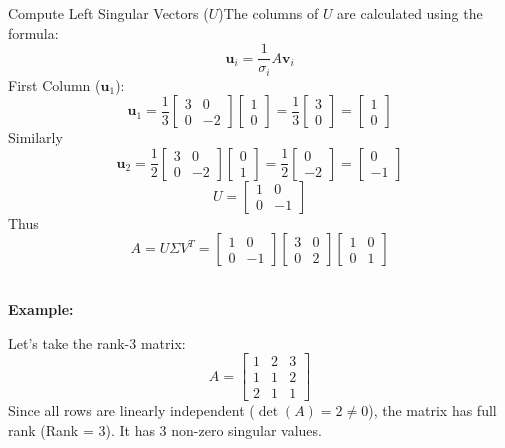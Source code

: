 \documentclass[DIV=20,oneside]{scrartcl}
\newcommand{\example}{
	\noindent\textbf{\\Example: }
}
\begin{document}
\begin{itemize}
	Compute Left Singular Vectors ($U$)The columns of $U$ are calculated using the formula:$$\mathbf{u}_i = \frac{1}{\sigma_i} A \mathbf{v}_i$$First Column ($\mathbf{u}_1$):$$\mathbf{u}_1 = \frac{1}{3} \begin{bmatrix} 3 & 0 \\ 0 & -2 \end{bmatrix} \begin{bmatrix} 1 \\ 0 \end{bmatrix} = \frac{1}{3} \begin{bmatrix} 3 \\ 0 \end{bmatrix} = \begin{bmatrix} 1 \\ 0 \end{bmatrix}$$
	Similarly $$\mathbf{u}_2 = \frac{1}{2} \begin{bmatrix} 3 & 0 \\ 0 & -2 \end{bmatrix} \begin{bmatrix} 0 \\ 1 \end{bmatrix} = \frac{1}{2} \begin{bmatrix} 0 \\ -2 \end{bmatrix} = \begin{bmatrix} 0 \\ -1 \end{bmatrix}$$
	$$U = \begin{bmatrix} 1 & 0 \\ 0 & -1 \end{bmatrix}$$
	Thus
	$$A= U \Sigma V^T = \begin{bmatrix} 1 & 0 \\ 0 & -1 \end{bmatrix} \begin{bmatrix} 3 & 0 \\ 0 & 2 \end{bmatrix} \begin{bmatrix} 1 & 0 \\ 0 & 1 \end{bmatrix}$$
	\example
	Let's take the rank-3 matrix:$$A = \begin{bmatrix} 1 & 2 & 3 \\ 1 & 1 & 2 \\ 2 & 1 & 1 \end{bmatrix}$$
	Since all rows are linearly independent ($\det(A) = 2 \neq 0$), the matrix has full rank (Rank = 3). It has 3 non-zero singular values.

\end{itemize}
\end{document}
